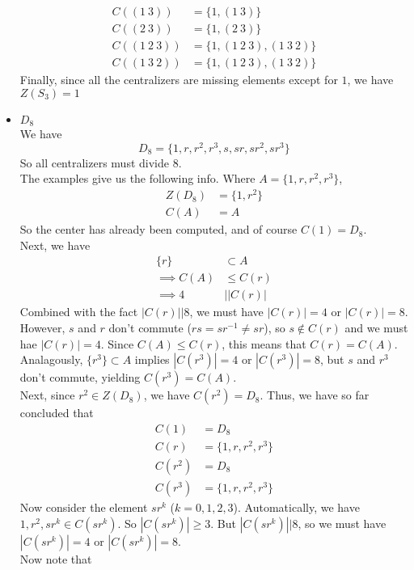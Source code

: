 \documentclass{article}
\newcommand{\set}[1]{ \{ #1 \} }
\newcommand{\inv}[1]{ {#1}^{-1} }
\newcommand{\norm}[1]{|#1|}
\newcommand{\divides}{\vert}
\begin{document}
\begin{itemize}
\begin{align*}
C( (1\ 3) ) &= \set{1, (1\ 3)}\\
C( (2\ 3) ) &= \set{1, (2\ 3)}\\
C( (1\ 2\ 3) ) &= \set{1, (1\ 2\ 3), (1\ 3\ 2)}\\
C( (1\ 3\ 2) ) &= \set{1, (1\ 2\ 3), (1\ 3\ 2)}
\end{align*}
Finally, since all the centralizers are missing elements except for $1$, we have $Z(S_3) = 1$
\item $D_8$\\
We have
\begin{equation}
D_8 = \set{1, r, r^2, r^3, s, sr, sr^2, sr^3}
\end{equation}
So all centralizers must divide $8$.\\
The examples give us the following info. Where $A = \set{1,r,r^2,r^3}$,
\begin{align*}
Z(D_8) &= \set{1, r^2}\\
C(A) &= A
\end{align*}
So the center has already been computed, and of course $C(1) = D_8$.\\
Next, we have
\begin{align*}
\set{r} &\subset A\\
\implies C(A) &\leq C(r)\\
\implies 4 &\divides \norm{C(r)}
\end{align*}
Combined with the fact $\norm{C(r)}\divides 8$, we must have $\norm{C(r)}=4$ or $\norm{C(r)}=8$. However, $s$ and $r$ don't commute ($rs = s\inv{r} \neq sr$), so $s \notin C(r)$ and we must hae $\norm{C(r)} = 4$. Since $C(A) \leq C(r)$, this means that $C(r) = C(A)$.\\
Analagously, $\set{r^3} \subset A$ implies $\norm{C(r^3)}=4$ or $\norm{C(r^3)}=8$, but $s$ and $r^3$ don't commute, yielding $C(r^3) = C(A)$.\\
Next, since $r^2 \in Z(D_8)$, we have $C(r^2) = D_8$. Thus, we have so far concluded that
\begin{align*}
C(1) &= D_8\\
C(r) &= \set{1,r,r^2,r^3}\\
C(r^2) &= D_8\\
C(r^3) &= \set{1,r,r^2,r^3}
\end{align*}
Now consider the element $sr^k$ ($k=0,1,2,3$). Automatically, we have $1,r^2,sr^k\in C(sr^k)$. So $\norm{C(sr^k)} \geq 3$. But $\norm{C(sr^k)} \divides 8$, so we must have $\norm{C(sr^k)} = 4$ or $\norm{C(sr^k)} = 8$.\\
Now note that 
\begin{align*}

\end{align*}
\end{itemize}
\end{document}
